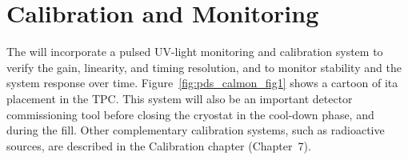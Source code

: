 \section{Calibration and Monitoring}
\label{sec:fdsp-pd-CandM}




The  will incorporate a  pulsed UV-light monitoring and calibration system %
to verify the  gain, linearity, and timing resolution, and to monitor stability and the system response over time.  Figure~\ref{fig:pds_calmon_fig1} shows a cartoon of ita  placement in the TPC. This system will also be an important detector commissioning tool before closing the cryostat  
in the cool-down phase, and during the \lar fill.
Other complementary calibration systems, such as radioactive sources, are described in the  Calibration chapter (Chapter~7). 

